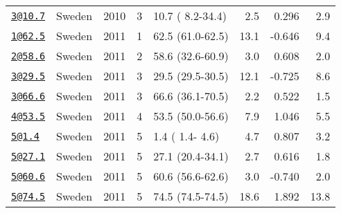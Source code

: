 \documentclass[]{article}
\begin{document}
\begin{longtable}[]{@{}llrrlrrr@{}}
\href{mailto:3@10.7}{\nolinkurl{3@10.7}} & Sweden & 2010 & 3 & 10.7 ( 8.2-34.4) & 2.5 & 0.296 & 2.9\tabularnewline
\href{mailto:1@62.5}{\nolinkurl{1@62.5}} & Sweden & 2011 & 1 & 62.5 (61.0-62.5) & 13.1 & -0.646 & 9.4\tabularnewline
\href{mailto:2@58.6}{\nolinkurl{2@58.6}} & Sweden & 2011 & 2 & 58.6 (32.6-60.9) & 3.0 & 0.608 & 2.0\tabularnewline
\href{mailto:3@29.5}{\nolinkurl{3@29.5}} & Sweden & 2011 & 3 & 29.5 (29.5-30.5) & 12.1 & -0.725 & 8.6\tabularnewline
\href{mailto:3@66.6}{\nolinkurl{3@66.6}} & Sweden & 2011 & 3 & 66.6 (36.1-70.5) & 2.2 & 0.522 & 1.5\tabularnewline
\href{mailto:4@53.5}{\nolinkurl{4@53.5}} & Sweden & 2011 & 4 & 53.5 (50.0-56.6) & 7.9 & 1.046 & 5.5\tabularnewline
\href{mailto:5@1.4}{\nolinkurl{5@1.4}} & Sweden & 2011 & 5 & 1.4 ( 1.4- 4.6) & 4.7 & 0.807 & 3.2\tabularnewline
\href{mailto:5@27.1}{\nolinkurl{5@27.1}} & Sweden & 2011 & 5 & 27.1 (20.4-34.1) & 2.7 & 0.616 & 1.8\tabularnewline
\href{mailto:5@60.6}{\nolinkurl{5@60.6}} & Sweden & 2011 & 5 & 60.6 (56.6-62.6) & 3.0 & -0.740 & 2.0\tabularnewline
\href{mailto:5@74.5}{\nolinkurl{5@74.5}} & Sweden & 2011 & 5 & 74.5 (74.5-74.5) & 18.6 & 1.892 & 13.8\tabularnewline
\bottomrule
\end{longtable}

\newpage
\end{document}

